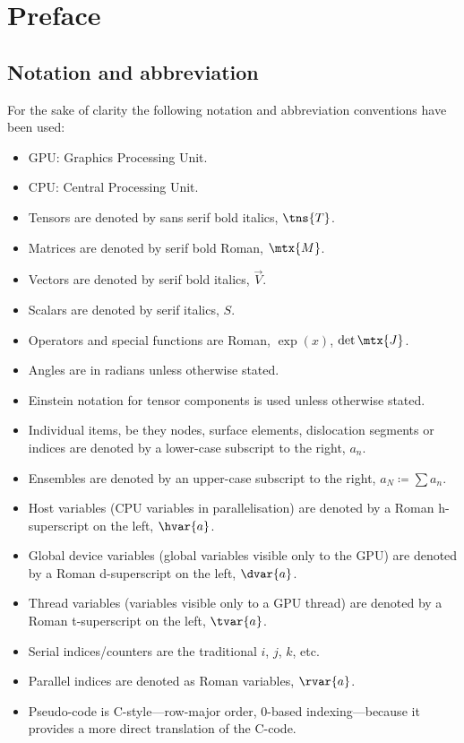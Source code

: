 \addtocounter{chapter}{-1}
\chapter{Preface}
\label{c:pre}

\section{Notation and abbreviation}
\label{s:nota}

For the sake of clarity the following notation and abbreviation conventions have been used:
\begin{itemize}
	\item GPU: Graphics Processing Unit.
	\item CPU: Central Processing Unit.
	\item Tensors are denoted by sans serif bold italics, $ \tns{T} $.
	\item Matrices are denoted by serif bold Roman, $ \mtx{M} $.
	\item Vectors are denoted by serif bold italics, $ \vec{V} $.
	\item Scalars are denoted by serif italics, $ S $.
	\item Operators and special functions are Roman, $\exp(x)$, $\det{\mtx{J}}$.
	\item Angles are in radians unless otherwise stated.
	\item Einstein notation for tensor components is used unless otherwise stated.
	\item Individual items, be they nodes, surface elements, dislocation segments or indices are denoted by a lower-case subscript to the right, $a_n$.
	\item Ensembles are denoted by an upper-case subscript to the right, $a_N \coloneqq \sum a_n$.
	\item Host variables (CPU variables in parallelisation) are denoted by a Roman h-superscript on the left, $\hvar{a}$.
	\item Global device variables (global variables visible only to the GPU) are denoted by a Roman d-superscript on the left, $\dvar{a}$.
	\item Thread variables (variables visible only to a GPU thread) are denoted by a Roman t-superscript on the left, $\tvar{a}$.
	\item Serial indices/counters are the traditional $i$, $j$, $k$, etc.
	\item Parallel indices are denoted as Roman variables, $\rvar{a}$.
	\item Pseudo-code is C-style---row-major order, 0-based indexing---because it provides a more direct translation of the C-code.
\end{itemize}

